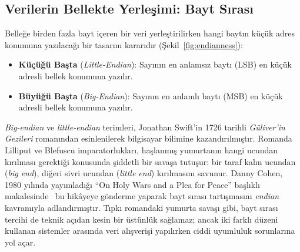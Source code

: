 \subsection{Verilerin Bellekte Yerleşimi: Bayt Sırası}
\label{subsec:bayt-sirasi}

Belleğe birden fazla bayt içeren bir veri yerleştirilirken hangi baytın küçük adres konumuna yazılacağı bir tasarım kararıdır (Şekil~\ref{fig:endianness}):
\begin{itemize}
\item \textbf{Küçüğü Başta} (\emph{Little-Endian}): Sayının en anlamsız baytı (LSB) en küçük adresli bellek konumuna yazılır.
\item \textbf{Büyüğü Başta} (\emph{Big-Endian}): Sayının en anlamlı baytı (MSB) en küçük adresli bellek konumuna yazılır.
\end{itemize}

\begin{bilginot}
\emph{Big-endian} ve \emph{little-endian} terimleri, Jonathan Swift'in 1726 tarihli \emph{Güliver'in Gezileri} romanından esinlenilerek bilgisayar bilimine kazandırılmıştır. Romanda Lilliput ve Blefuscu imparatorlukları, haşlanmış yumurtanın hangi ucundan kırılması gerektiği konusunda şiddetli bir savaşa tutuşur: bir taraf kalın ucundan (\emph{big end}), diğeri sivri ucundan (\emph{little end}) kırılmasını savunur. Danny Cohen, 1980 yılında yayımladığı ``On Holy Wars and a Plea for Peace'' başlıklı makalesinde~\cite{cohen1980} bu hikâyeye gönderme yaparak bayt sırası tartışmasını \emph{endian} kavramıyla adlandırmıştır. Tıpkı romandaki yumurta savaşı gibi, bayt sırası tercihi de teknik açıdan kesin bir üstünlük sağlamaz; ancak iki farklı düzeni kullanan sistemler arasında veri alışverişi yapılırken ciddi uyumluluk sorunlarına yol açar.
\end{bilginot}

